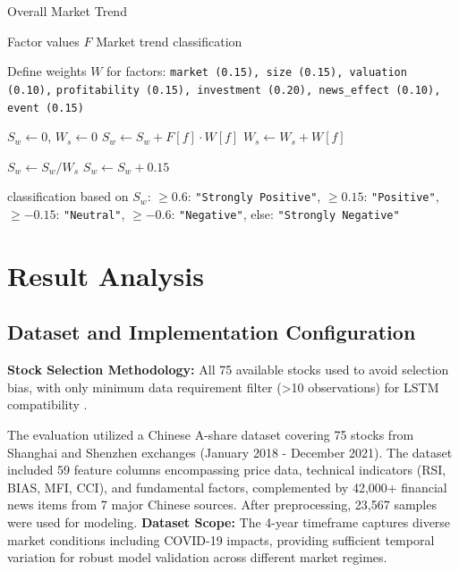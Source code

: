 \documentclass[3p,times,procedia]{elsarticle}
\begin{document}
\begin{algorithm}[H]
\caption{Overall Market Trend}
\label{alg:market_trend}
\begin{algorithmic}[1]
    \Require Factor values $F$
    \Ensure Market trend classification
    
    \State Define weights $W$ for factors: \texttt{market (0.15), size (0.15), valuation (0.10),}
    \Statex \hspace{8mm} \texttt{profitability (0.15), investment (0.20), news\_effect (0.10), event (0.15)}
    
    \State $S_w \gets 0$, $W_s \gets 0$
            \State $S_w \gets S_w + F[f] \cdot W[f]$
            \State $W_s \gets W_s + W[f]$
        \EndIf
    \EndFor
    
     \State $S_w \gets S_w / W_s$ \EndIf
    \State $S_w \gets S_w + 0.15$ 

    \State \Return classification based on $S_w$: 
    \Statex \hspace{4mm} $\geq 0.6$: \texttt{"Strongly Positive"}, 
    $\geq 0.15$: \texttt{"Positive"},
    \Statex \hspace{4mm} $\geq -0.15$: \texttt{"Neutral"},
    $\geq -0.6$: \texttt{"Negative"}, else: \texttt{"Strongly Negative"}
\end{algorithmic}
\end{algorithm}

\vspace{0.5cm}
\section{Result Analysis}

\subsection{Dataset and Implementation Configuration}

\textbf{Stock Selection Methodology:} All 75 available stocks used to avoid selection bias, with only minimum data requirement filter (>10 observations) for LSTM compatibility \cite{FinReportDataset2025}.

The evaluation utilized a Chinese A-share dataset covering 75 stocks from Shanghai and Shenzhen exchanges (January 2018 - December 2021). The dataset included 59 feature columns encompassing price data, technical indicators (RSI, BIAS, MFI, CCI), and fundamental factors, complemented by 42,000+ financial news items from 7 major Chinese sources. After preprocessing, 23,567 samples were used for modeling. \textbf{Dataset Scope:} The 4-year timeframe captures diverse market conditions including COVID-19 impacts, providing sufficient temporal variation for robust model validation across different market regimes.
\end{document}
